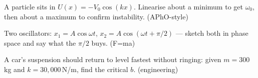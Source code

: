 \begin{exercise}[hard]
A particle sits in $U(x)=-V_0\cos(kx)$. Linearise about a minimum to
get $\omega_0$, then about a maximum to confirm instability.
(APhO-style)
\end{exercise}
\begin{exercise}[medium]
Two oscillators: $x_1=A\cos\omega t$, $x_2=A\cos(\omega t+\pi/2)$ ---
sketch both in phase space and say what the $\pi/2$ buys. (F=ma)
\end{exercise}
\begin{exercise}[medium]
A car's suspension should return to level fastest without ringing:
given $m=300$\,kg and $k=30{,}000$\,N/m, find the critical $b$.
(engineering)
\end{exercise}
